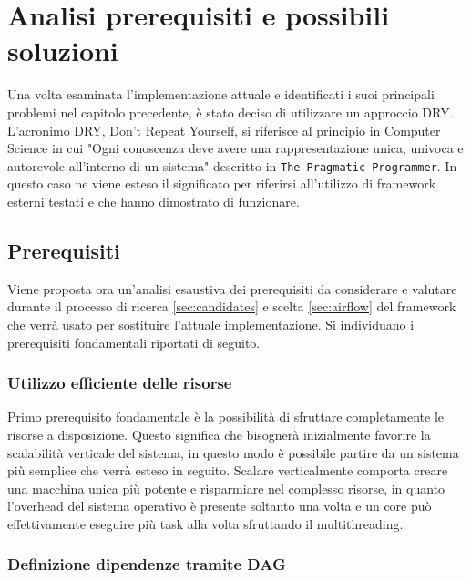 \chapter{Analisi prerequisiti e possibili soluzioni}
\label{sec:analisi_ricerca}

Una volta esaminata l'implementazione attuale e identificati i suoi principali
problemi nel capitolo precedente, è stato deciso di utilizzare un approccio DRY.
L'acronimo DRY, Don't Repeat Yourself, si riferisce al principio in Computer
Science in cui "Ogni conoscenza deve avere una rappresentazione unica, univoca e
autorevole all’interno di un sistema" descritto in \texttt{The Pragmatic
Programmer}\cite{thomas2019pragmatic}. In questo caso ne viene esteso il
significato per riferirsi all'utilizzo di framework esterni testati e che hanno
dimostrato di funzionare.

\section{Prerequisiti}
\label{sec:prerequisiti}

Viene proposta ora un'analisi esaustiva dei prerequisiti da considerare e valutare
durante il processo di ricerca \ref{sec:candidates} e scelta \ref{sec:airflow} del
framework che verrà usato per sostituire l'attuale implementazione. Si
individuano i prerequisiti fondamentali riportati di seguito.

\subsection{Utilizzo efficiente delle risorse}
\label{sub:resource_usage}

Primo prerequisito fondamentale è la possibilità di sfruttare completamente le risorse
a disposizione. Questo significa che bisognerà inizialmente favorire la
scalabilità verticale del sistema, in questo modo è possibile partire da un sistema
più semplice che verrà esteso in seguito. Scalare verticalmente comporta creare
una macchina unica più potente e risparmiare nel complesso risorse, in quanto l'overhead
del sistema operativo è presente soltanto una volta e un core può effettivamente
eseguire più task alla volta sfruttando il multithreading.

\subsection{Definizione dipendenze tramite DAG}
\label{sub:deps_definition}

